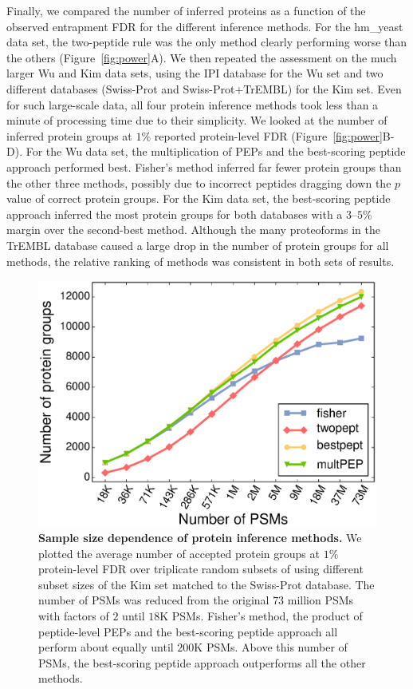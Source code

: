 \documentclass{article}
\begin{document}
Finally, we compared the number of inferred proteins as a function of
the observed entrapment FDR for the different inference methods.  For
the hm\_yeast data set, the two-peptide rule was the only method
clearly performing worse than the others (Figure~\ref{fig:power}A). We
then repeated the assessment on the much larger Wu and Kim data sets,
using the IPI database for the Wu set and two different databases
(Swiss-Prot and Swiss-Prot+TrEMBL) for the Kim set. Even for such
large-scale data, all four protein inference methods took less than a
minute of processing time due to their simplicity. We looked at the
number of inferred protein groups at $1\%$ reported protein-level FDR
(Figure~\ref{fig:power}B-D). For the Wu data set, the multiplication
of PEPs and the best-scoring peptide approach performed best. Fisher's
method inferred far fewer protein groups than the other three methods,
possibly due to incorrect peptides dragging down the $p$ value of
correct protein groups. For the Kim data set, the best-scoring peptide
approach inferred the most protein groups for both databases with a
$3\mbox{--}5\%$ margin over the second-best method. Although the many
proteoforms in the TrEMBL database caused a large drop in the number
of protein groups for all methods, the relative ranking of methods was
consistent in both sets of results. 

\begin{figure}
\centering
\includegraphics[width=0.6\linewidth]
{./img/kim-downsampling-performance}
  \caption{{\bf Sample size dependence of protein inference methods.}
    We plotted the average number of accepted protein groups at $1\%$
    protein-level FDR over triplicate random subsets of using
    different subset sizes of the Kim set matched to the Swiss-Prot
    database.  The number of PSMs was reduced from the original $73$
    million PSMs with factors of $2$ until $18$K PSMs. Fisher's
    method, the product of peptide-level PEPs and the best-scoring
    peptide approach all perform about equally until $200$K
    PSMs. Above this number of PSMs, the best-scoring peptide approach
    outperforms all the other methods.}
  \label{fig:power-downsample}
\end{figure}
\end{document}
